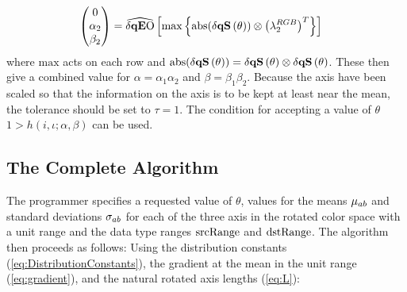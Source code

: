 \begin{align*}
 \begin{pmatrix}  0   \\   \alpha_2   \\  \beta_2   \\ \end{pmatrix}     &=  
\dqEO\left[  
\max \left\{\text{abs}(\dqs[\theta]) \otimes \left(\discard^{RGB}_2 \right)^T \right\}
\right]
\end{align*}
where $\text{max}$ acts on each row and $\text{abs}(\dqs[\theta])  = \dqs[\theta] \otimes \dqs[\theta]$. 
These then give a combined value for $\alpha = \alpha_1 \alpha_2$ and $\beta = \beta_1 \beta_2$. Because the axis have been scaled so that the information on the axis is to be kept at least near the mean, the tolerance should be set to $\tau =1$. The condition for accepting a value of $\theta$ $1 > h(i,\iota; \alpha,\beta)$ can be used.

\subsection{The Complete Algorithm}


The programmer specifies a requested value of $\theta$, values for the means $\mu_{ab}$ and standard deviations $\sigma_ {ab}$ for each of the three axis in the rotated color space with a unit range and the data type ranges $\text{srcRange}$ and $\text{dstRange}$. The algorithm then proceeds as follows:
\newline
{} 
Using the distribution constants (\ref{eq:DistributionConstants}), the gradient at the mean in the unit range (\ref{eq:gradient}), and the natural rotated axis lengths (\ref{eq:L}):



